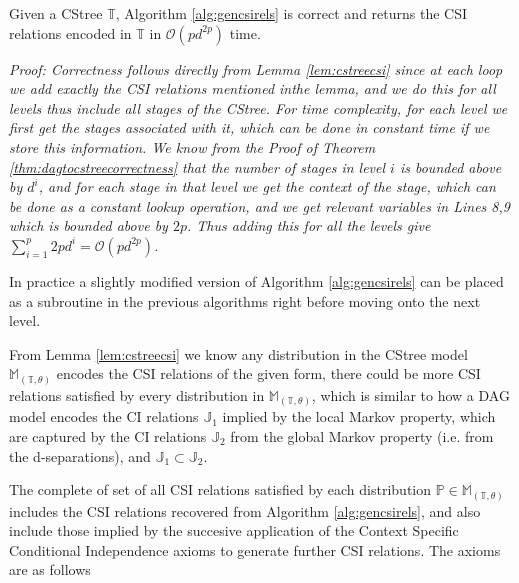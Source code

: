 \documentclass{tufte-book}
\begin{document}
\begin{theorem}\label{thm:gencsirelscorrectness}
Given a CStree $\mathbb{T}$, Algorithm \ref{alg:gencsirels} is correct and returns the CSI relations encoded in $\mathbb{T}$ in $\mathcal{O}(pd^{2p})$ time.
\end{theorem}
\textit{Proof: Correctness follows directly from Lemma \ref{lem:cstreecsi} since at each loop we add exactly the CSI relations mentioned inthe lemma, and we do this for all levels thus include all stages of the CStree. For time complexity, for each level we first get the stages associated with it, which can be done in constant time if we store this information. We know from the Proof of Theorem \ref{thm:dagtocstreecorrectness} that the number of stages in level $i$ is bounded above by $d^i$, and for each stage in that level we get the context of the stage, which can be done as a constant lookup operation, and we get relevant variables in Lines 8,9 which is bounded above by $2p$. Thus adding this for all the levels give $\sum_{i=1}^p 2pd^i = \mathcal{O}(pd^{2p})$.
}


In practice a slightly modified version of Algorithm \ref{alg:gencsirels} can be placed as a subroutine in the previous algorithms right before moving onto the next level.


From Lemma \ref{lem:cstreecsi} we know any distribution in the CStree model \(\mathbb{M}_{(\mathbb{T},\theta)}\) encodes the CSI relations of the given form, there could be more CSI relations satisfied by every distribution in \(\mathbb{M}_{(\mathbb{T},\theta)}\), which is similar to how a DAG model encodes the CI relations \(\mathbb{J}_1\) implied by the local Markov property, which are captured by the CI relations \(\mathbb{J}_2\) from the global Markov property (i.e. from the d-separations), and \(\mathbb{J}_1 \subset \mathbb{J}_2\).


The complete of set of all CSI relations satisfied by each distribution \(\mathbb{P} \in \mathbb{M}_{(\mathbb{T},\theta)}\) includes the CSI relations recovered from Algorithm \ref{alg:gencsirels}, and also include those implied by the succesive application of the Context Specific Conditional Independence axioms to generate further CSI relations. The axioms are as follows
\end{document}

